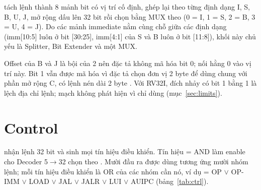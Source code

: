 \documentclass[../report.tex]{subfiles}
\begin{document}
 tách lệnh thành 8 mảnh bit có vị trí cố định, ghép lại theo từng định dạng I, S, B, U, J, mở rộng dấu
lên 32 bit rồi chọn bằng MUX theo  (0 = I, 1 = S, 2 = B, 3 = U, 4 = J). Do các mảnh immediate nằm cùng
chỗ giữa các định dạng (imm[10:5] luôn ở bit [30:25], imm[4:1] của S và B luôn ở bit [11:8]), khối này chủ yếu là
Splitter, Bit Extender và một MUX.

Offset của B và J là bội của 2 nên đặc tả không mã hóa bit 0;  nối hằng 0 vào vị trí này. Bit 1 vẫn
được mã hóa vì đặc tả chọn đơn vị 2 byte để dùng chung với phần mở rộng C, có lệnh nén dài 2 byte
\cite{riscv-spec}. Với RV32I, đích nhảy có bit 1 bằng 1 là lệch địa chỉ lệnh; mạch không phát hiện vì
 chỉ dùng  (mục~\ref{sec:limits}).

\section{Control}\label{sec:control}

 nhận lệnh 32 bit và sinh mọi tín hiệu điều khiển. Tín hiệu  =  AND
 làm enable cho Decoder 5$\to$32 chọn theo . Mười đầu ra được dùng tương ứng mười nhóm
lệnh; mỗi tín hiệu điều khiển là OR của các nhóm cần nó, ví dụ  = OP $\lor$ OP-IMM $\lor$ LOAD
$\lor$ JAL $\lor$ JALR $\lor$ LUI $\lor$ AUIPC (bảng~\ref{tab:ctrl}).
\end{document}
